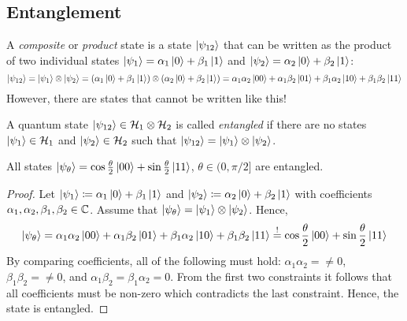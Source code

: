 		\subsection{Entanglement}
			A \emph{composite} or \emph{product} state is a state \(\ket{\psi_{12}}\) that can be written as the product of two individual states \( \ket{\psi_1} = \alpha_1 \ket{0} + \beta_1 \ket{1} \) and \( \ket{\psi_2} = \alpha_2 \ket{0} + \beta_2 \ket{1} \):
			\begin{equation}
				\ket{\psi_{12}}
				= \ket{\psi_1} \otimes \ket{\psi_2}
				= (\alpha_1 \ket{0} + \beta_1 \ket{1}) \otimes (\alpha_2 \ket{0} + \beta_2 \ket{1})
				= \alpha_1 \alpha_2 \ket{00} + \alpha_1 \beta_2 \ket{01} + \beta_1 \alpha_2 \ket{10} + \beta_1 \beta_2 \ket{11}
			\end{equation}
			However, there are states that cannot be written like this!

			\begin{definition}
				A quantum state \( \ket{\psi_{12}} \in \mathcal{H}_1 \otimes \mathcal{H}_2 \) is called \emph{entangled} if there are no states \( \ket{\psi_1} \in \mathcal{H}_1 \) and \( \ket{\psi_2} \in \mathcal{H}_2 \) such that \( \ket{\psi_{12}} = \ket{\psi_1} \otimes \ket{\psi_2} \).
			\end{definition}

			\begin{theorem}
				All states \( \ket{\psi_\theta} = \cos\frac{\theta}{2} \ket{00} + \sin\frac{\theta}{2} \ket{11} \), \( \theta \in (0, \pi/2] \) are entangled.
			\end{theorem}
			\begin{proof}
				Let \( \ket{\psi_1} \coloneqq \alpha_1 \ket{0} + \beta_1 \ket{1} \) and \( \ket{\psi_2} \coloneqq \alpha_2 \ket{0} + \beta_2 \ket{1} \) with coefficients \( \alpha_1, \alpha_2, \beta_1, \beta_2 \in \mathbb{C} \). Assume that \( \ket{\psi_\theta} = \ket{\psi_1} \otimes \ket{\psi_2} \). Hence,
				\begin{equation}
					\ket{\psi_\theta}
					= \alpha_1 \alpha_2 \ket{00} + \alpha_1 \beta_2 \ket{01} + \beta_1 \alpha_2 \ket{10} + \beta_1 \beta_2 \ket{11}
					\overset{!}{=} \cos\frac{\theta}{2} \ket{00} + \sin\frac{\theta}{2} \ket{11}
				\end{equation}
				By comparing coefficients, all of the following must hold: \( \alpha_1 \alpha_2 = \neq 0 \), \( \beta_1 \beta_2 = \neq 0 \), and \( \alpha_1 \beta_2 = \beta_1 \alpha_2 = 0 \). From the first two constraints it follows that all coefficients must be non-zero which contradicts the last constraint. Hence, the state is entangled.
			\end{proof}

